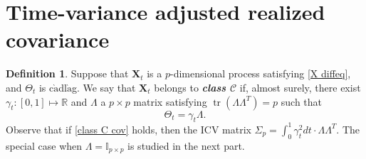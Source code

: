 \documentclass[a4paper,11pt]{article}
\theoremstyle{plain}
\theoremstyle{definition}
\newtheorem{defn}[thm]{Definition}
\newcommand{\MR}{\mathbb{R}}
\newcommand{\tr}{\operatorname{tr}}
\newcommand{\define}[1]{\textit{\textbf{#1}}}
\begin{document}
    \section*{Time-variance adjusted realized covariance}
    
    \begin{defn}
   		Suppose that $\mathbf{X}_t$ is a $p$-dimensional process satisfying \eqref{X diffeq}, and $\Theta_t$ is c$\grave{\text{a}}$dl$\grave{\text{a}}$g. We say that $\mathbf{X}_t$ belongs to \define{class $\mathcal{C}$} if, almost surely, there exist $\gamma_t: [0, 1] \mapsto \MR$ and $\Lambda$ a $p \times p$ matrix satisfying $\tr(\Lambda \Lambda^T) = p$ such that 
   		\begin{equation} \label{class C cov}
   		\Theta_t = \gamma_t \Lambda.
   		\end{equation}
   		Observe that if \eqref{class C cov} holds, then the ICV matrix $\Sigma_p = \int_{0}^{1} \gamma_t^2 dt \cdot \Lambda \Lambda^T$. The special case when $\Lambda = \mathbb{I}_{p \times p}$ is studied in the next part.
   	\end{defn}
    		
\end{document}
